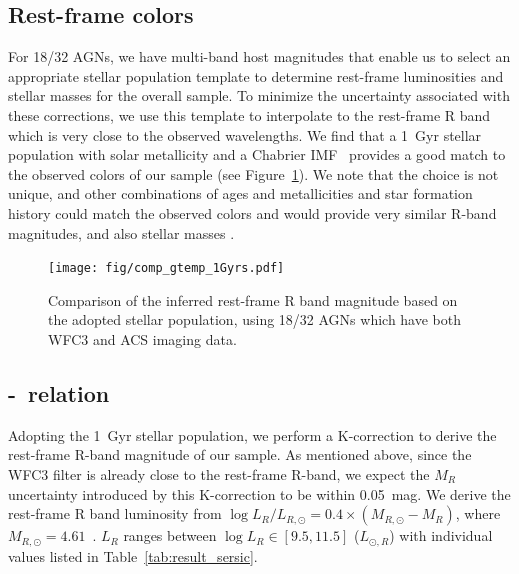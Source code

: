 \documentclass[apj]{emulateapj}
\begin{document}

\subsection{Rest-frame colors}

For 18/32 AGNs, we have multi-band host magnitudes that enable us to select an appropriate stellar population template to determine rest-frame luminosities and stellar masses for the overall sample. To minimize the uncertainty associated with these corrections, we use this template to interpolate to the rest-frame R band which is very close to the observed wavelengths.  We find that a 1~Gyr stellar population with solar metallicity and a Chabrier IMF~\citep{Bruzual2003} provides a good match to the observed colors of our sample (see Figure~\ref{fig:compare_temp}). We note that the choice is not unique, and other combinations of ages and metallicities and star formation history could match the observed colors and would provide very similar R-band magnitudes, and also stellar masses \citep{Bell2000, Bell2001}. %

\begin{figure}
\centering
{\texttt{[image: fig/comp\_gtemp\_1Gyrs.pdf]}}
\caption{\label{fig:compare_temp} 
Comparison of the inferred rest-frame R band magnitude based on the adopted stellar population, using 18/32 AGNs which have both WFC3 and ACS imaging data.
}
\end{figure} 
 
\subsection{\mbh-\lhost\ relation}\label{sec:ml}

Adopting the 1~Gyr stellar population, we perform a K-correction to derive the rest-frame R-band magnitude of our sample. As mentioned above, since the WFC3 filter is already close to the rest-frame R-band, we expect the $M_R$ uncertainty introduced by this K-correction to be within 0.05~mag. We derive the rest-frame R band luminosity from $\log L_R/L_{R, \odot} = 0.4\times(M_{R, \odot}-M_R)$, where $M_{R, \odot}=4.61$~\citep{Blanton07}. $L_R$ ranges between $\log L_R \in [9.5, 11.5]$ ($L_{\odot,R}$) with individual values listed in Table~\ref{tab:result_sersic}. 
\end{document}
